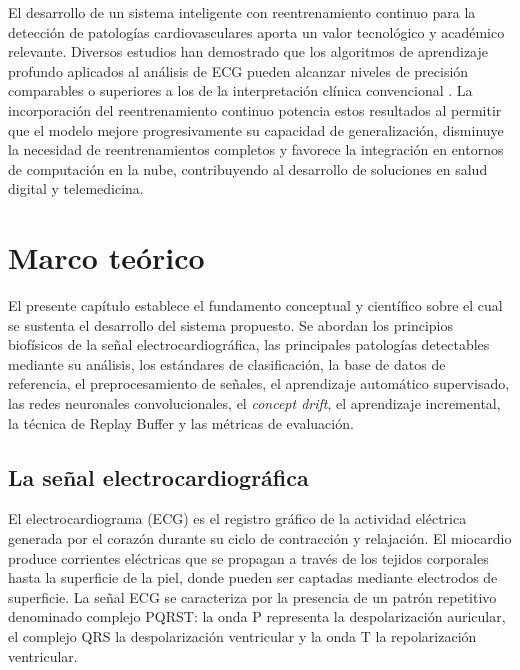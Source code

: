 \documentclass[11pt,spanish]{citedi}
\begin{document}
El desarrollo de un sistema inteligente con reentrenamiento continuo para la detección de patologías cardiovasculares aporta un valor tecnológico y académico relevante. Diversos estudios han demostrado que los algoritmos de aprendizaje profundo aplicados al análisis de ECG pueden alcanzar niveles de precisión comparables o superiores a los de la interpretación clínica convencional \cite{Chang2019, Reshad2025, ESC2023}. La incorporación del reentrenamiento continuo potencia estos resultados al permitir que el modelo mejore progresivamente su capacidad de generalización, disminuye la necesidad de reentrenamientos completos y favorece la integración en entornos de computación en la nube, contribuyendo al desarrollo de soluciones en salud digital y telemedicina.

\chapter{Marco teórico}

El presente capítulo establece el fundamento conceptual y científico sobre el cual se sustenta el desarrollo del sistema propuesto. Se abordan los principios biofísicos de la señal electrocardiográfica, las principales patologías detectables mediante su análisis, los estándares de clasificación, la base de datos de referencia, el preprocesamiento de señales, el aprendizaje automático supervisado, las redes neuronales convolucionales, el \textit{concept drift}, el aprendizaje incremental, la técnica de Replay Buffer y las métricas de evaluación.

\section{La señal electrocardiográfica}

El electrocardiograma (ECG) es el registro gráfico de la actividad eléctrica generada por el corazón durante su ciclo de contracción y relajación. El miocardio produce corrientes eléctricas que se propagan a través de los tejidos corporales hasta la superficie de la piel, donde pueden ser captadas mediante electrodos de superficie. La señal ECG se caracteriza por la presencia de un patrón repetitivo denominado complejo PQRST: la onda P representa la despolarización auricular, el complejo QRS la despolarización ventricular y la onda T la repolarización ventricular.
\end{document}
